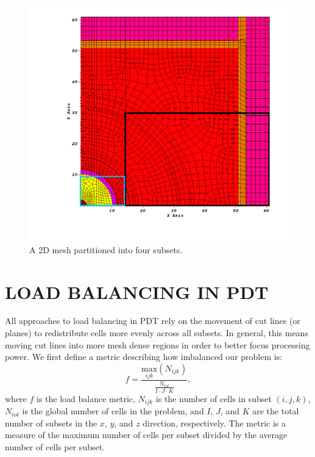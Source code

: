 \documentclass[letterpaper]{mandc2019}
\begin{document}
\begin{figure}[H]
\centering
\includegraphics[scale=0.5,trim={3cm 2cm 1cm 1cm},clip]{figures/subset_example.png}
\caption{A 2D mesh partitioned into four subsets.}
\label{subset_example}
\end{figure}

\section{LOAD BALANCING IN PDT}

All approaches to load balancing in PDT rely on the movement of cut lines (or planes) to redistribute cells more evenly across all subsets. In general, this means moving cut lines into more mesh dense regions in order to better focus processing power. We first define a metric describing how imbalanced our problem is:
\begin{equation}
f =\frac{\underset{ijk}{\text{max}}(N_{ijk})}{\frac{N_{tot}}{I\cdot J\cdot K}},
\label{metric_def}
\end{equation}
where $f$ is the load balance metric, $N_{ijk}$ is the number of cells in subset $(i,j,k)$, $N_{tot}$ is the global number of cells in the problem, and $I$, $J$, and $K$ are the total number of subsets in the $x$, $y$, and $z$ direction, respectively. The metric is a measure of the maximum number of cells per subset divided by the average number of cells per subset.
\end{document}
